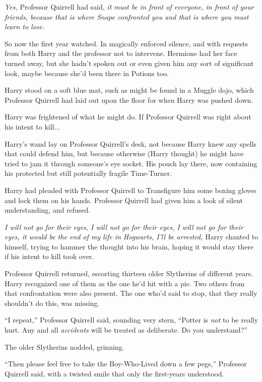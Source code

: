 \emph{Yes,} Professor Quirrell had said, \emph{it must be in front of everyone, in front of your friends, because that is where Snape confronted you and that is where you must learn to lose.}

So now the first year watched. In magically enforced silence, and with requests from both Harry and the professor not to intervene. Hermione had her face turned away, but she hadn't spoken out or even given him any sort of significant look, maybe because she'd been there in Potions too.

Harry stood on a soft blue mat, such as might be found in a Muggle dojo, which Professor Quirrell had laid out upon the floor for when Harry was pushed down.

Harry was frightened of what he might do. If Professor Quirrell was right about his intent to kill...

Harry's wand lay on Professor Quirrell's desk, not because Harry knew any spells that could defend him, but because otherwise (Harry thought) he might have tried to jam it through someone's eye socket. His pouch lay there, now containing his protected but still potentially fragile Time-Turner.

Harry had pleaded with Professor Quirrell to Transfigure him some boxing gloves and lock them on his hands. Professor Quirrell had given him a look of silent understanding, and refused.

\emph{I will not go for their eyes, I will not go for their eyes, I will not go for their eyes, it would be the end of my life in Hogwarts, I'll be arrested,} Harry chanted to himself, trying to hammer the thought into his brain, hoping it would stay there if his intent to kill took over.

Professor Quirrell returned, escorting thirteen older Slytherins of different years. Harry recognized one of them as the one he'd hit with a pie. Two others from that confrontation were also present. The one who'd said to stop, that they really shouldn't do this, was missing.

``I repeat,'' Professor Quirrell said, sounding very stern, ``Potter is \emph{not} to be really hurt. Any and all \emph{accidents} will be treated as deliberate. Do you understand?''

The older Slytherins nodded, grinning.

``Then please feel free to take the Boy-Who-Lived down a few pegs,'' Professor Quirrell said, with a twisted smile that only the first-years understood.

